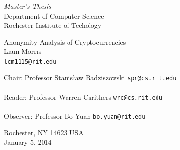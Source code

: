 \documentclass[11pt]{article}
\begin{document}
 \thispagestyle{empty} \begin{center} \begin{Large} \emph{Master's Thesis} \\ Department of Computer
Science \\ Rochester Institute of Techology \\ \end{Large} \vspace{4em} {\huge Anonymity Analysis of Cryptocurrencies}
\\ \vspace{3em} {\LARGE Liam Morris} \\ {\tt lcm1115@rit.edu} \\ \vspace{3em} \begin{adjustwidth}{.5in}{.5in} Chair:
    Professor Stanis{\l}aw Radziszowski \hfill {\tt spr@cs.rit.edu} \\ \vspace{2em} \hrulefill \\ \vspace{3em} Reader:
Professor Warren Carithers \hfill {\tt wrc@cs.rit.edu} \\ \vspace{2em} \hrulefill \\ \vspace{3em} Observer: Professor Bo
Yuan \hfill {\tt bo.yuan@rit.edu} \\ \vspace{2em} \hrulefill \end{adjustwidth} \vspace{2em} Rochester, NY 14623 USA \\
\vspace{2em} January 5, 2014 \end{center} \pagebreak \thispagestyle{empty} \begin{abstract} Cash in the real world
    allows for parties to exchange currency without the need to go through some sort of central authority. One person,
    Alice, can simply hand cash over to another person, Bob. In this transaction the only two people that have knowledge
    of this exchange are Alice and Bob. Until recently there was no electronic equivalent to this exchange. In 1982
    David Chaum proposed a system of anonymous electronic cash based on blind signatures, and in 1990 founded DigiCash
    as an electronic cash company. There were a few banks that implemented electronic cash systems, but these banks and
    DigiCash ultimately went bankrupt in 1997 and 1998 despite the enthusiasm surrounding anonymous electronic cash.
    Between 1998 and 2008 there were no successful implementations of electronic cash that offer a decentralized,
    anonymous, and untraceable system.


\end{abstract}
\end{document}
